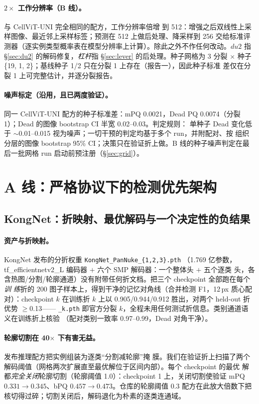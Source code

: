 \documentclass[11pt]{article}
\begin{document}
\paragraph{$2\times$ 工作分辨率（B 线）。}与 CellViT-UNI 完全相同的配方，工作分辨率倍增
到 512：增强之后双线性上采样图像、最近邻上采样标签；预测在 512 上做后处理、降采样到 256
交给标准评测器（逐实例类型概率表在模型分辨率上计算）。除此之外不作任何改动。$du2$ 指
\S\ref{sec:du2} 的解码修复，\emph{杠杆}指 \S\ref{sec:lever} 的后处理。种子网格为
3 分裂 $\times$ 种子 \{19, 1, 2\}；基线种子 1/2 只在分裂 1 上存在（报告一），因此种子标准
差仅在分裂 1 上可完整估计，并逐分裂报告。

\paragraph{噪声标定（沿用，且已两度验证）。}同一 CellViT-UNI 配方的种子标准差：mPQ
0.0021，Dead PQ 0.0074（分裂 1）；Dead 的图像 bootstrap CI 半宽 0.02--0.03。判定规则：
单种子 Dead 变化低于 $\sim$0.01--0.015 视为噪声；一切干预的判定均基于多个 run，并附配对、按
组织分层的图像 bootstrap 95\% CI；决策只在验证折上做。B 线的种子噪声判定在最后一批网格
run 启动前预注册（\S\ref{sec:grid}）。

\section{A 线：严格协议下的检测优先架构}
\label{sec:lineA}

\subsection{KongNet：折映射、最优解码与一个决定性的负结果}
\label{sec:kongnet}

\paragraph{资产与折映射。}KongNet 发布的分折权重
\texttt{KongNet\_PanNuke\_\allowbreak\{1,2,3\}.pth}
（1.769 亿参数，tf\_efficientnetv2\_L 编码器 $+$ 六个 SMP 解码器：一个整体头 $+$ 五个逐类
头，各含热图/分割/轮廓通道）没有附带任何折文档。把三个 checkpoint 全部跑在每个\emph{训
练}折的 200 图子样本上，得到干净的记忆对角线（合并检测 F1，12\,px 质心配对）：checkpoint
$k$ 在训练折 $k$ 上以 0.905/0.944/0.912 胜出，对两个 held-out 折优势 $\geq$0.13——
\texttt{\_k.pth} 即官方分裂 $k$，全程未用任何测试折信息。类别通道语义在训练折上核验
（配对类别一致率 0.97--0.99，Dead 对角干净）。

\paragraph{轮廓切割在 40$\times$ 下有害无益。}发布推理配方把实例组装为逐类“分割减轮廓”掩
膜。我们在验证折上扫描了两个解码阈值（网格两次扩展直至最优解位于区间内部）。每个 checkpoint 的最优
解都\emph{完全关闭}轮廓切割（轮廓阈值 1.0）：checkpoint 1 上，关闭切割使验证 mPQ
$0.331\!\to\!0.345$、bPQ $0.457\!\to\!0.473$。仓库的轮廓阈值 0.3 配方在此放大倍数下把核切得过碎；切割关闭后，解码退化为朴素的逐类连通域。
\end{document}
